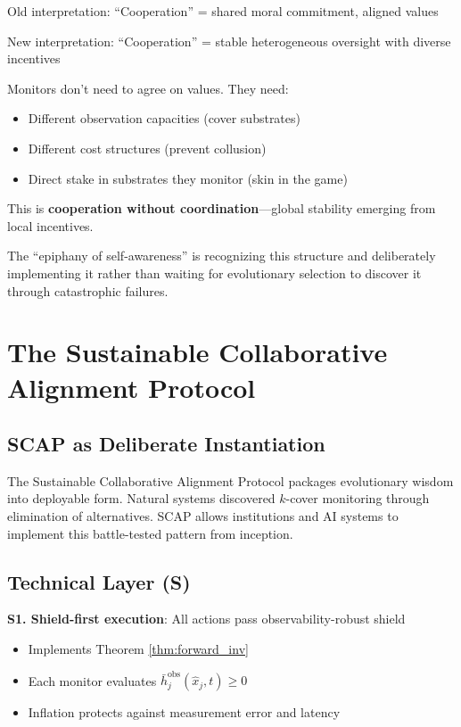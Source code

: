 \documentclass[11pt,a4paper]{article}
\theoremstyle{definition}
\begin{document}
Old interpretation: ``Cooperation'' = shared moral commitment, aligned values

New interpretation: ``Cooperation'' = stable heterogeneous oversight with diverse incentives

Monitors don't need to agree on values. They need:
\begin{itemize}
\item Different observation capacities (cover substrates)
\item Different cost structures (prevent collusion)  
\item Direct stake in substrates they monitor (skin in the game)
\end{itemize}

This is \textbf{cooperation without coordination}---global stability emerging from local incentives.

The ``epiphany of self-awareness'' is recognizing this structure and deliberately implementing it rather than waiting for evolutionary selection to discover it through catastrophic failures.

\section{The Sustainable Collaborative Alignment Protocol}

\subsection{SCAP as Deliberate Instantiation}

The Sustainable Collaborative Alignment Protocol packages evolutionary wisdom into deployable form. Natural systems discovered $k$-cover monitoring through elimination of alternatives. SCAP allows institutions and AI systems to implement this battle-tested pattern from inception.

\subsection{Technical Layer (S)}

\textbf{S1. Shield-first execution}: All actions pass observability-robust shield
\begin{itemize}
\item Implements Theorem \ref{thm:forward_inv}
\item Each monitor evaluates $\bar{h}_j^{\text{obs}}(\hat{x}_j, t) \geq 0$
\item Inflation protects against measurement error and latency
\end{itemize}
\end{document}

